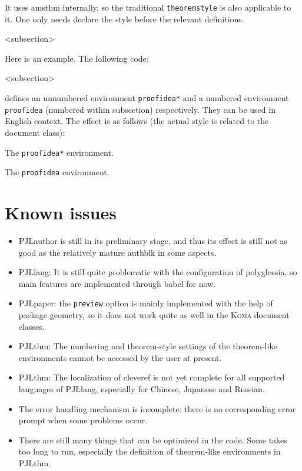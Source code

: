 \documentclass[allowbf]{lebhart}
\newenvironment{remind}[1][Remind]{%
    \begin{tcolorbox}[breakable,
        enhanced,
        width = \textwidth,
        colback = white, colbacktitle = paper,
        colframe = gray!50, boxrule=0.2mm,
        coltitle = black,
        fonttitle = \sffamily,
        attach boxed title to top left = {yshift=-\tcboxedtitleheight/2,  xshift=\tcboxedtitlewidth/4},
        boxed title style = {boxrule=0pt, colframe=paper},
        before skip = 0.3cm,
        after skip = 0.3cm,
        top = 3mm,
        bottom = 3mm,
        title={\scshape\sffamily #1}]%
}{\end{tcolorbox}}
\providecommand{\PJLauthor}{\textsf{PJLauthor}}
\providecommand{\PJLlang}{\textsf{PJLlang}}
\providecommand{\PJLpaper}{\textsf{PJLpaper}}
\providecommand{\PJLthm}{\textsf{PJLthm}}
\begin{document}
\begin{remind}
    It uses \textsf{amsthm} internally, so the traditional \texttt{theoremstyle} is also applicable to it. One only needs declare the style before the relevant definitions.
\end{remind}

\def\proofideanameEN{Idea}
<subsection>

\bigskip
Here is an example. The following code:
\begin{code}
  \def\proofideanameEN{Idea}
  <subsection>
\end{code}
defines an unnumbered environment \lstinline|proofidea*| and a numbered environment \lstinline|proofidea| (numbered within subsection) respectively. They can be used in English context. The effect is as follows (the actual style is related to the document class):

\begin{proofidea*}
    The \lstinline|proofidea*| environment.
\end{proofidea*}

\begin{proofidea}
    The \lstinline|proofidea| environment.
\end{proofidea}


\medskip
\section{Known issues}

\begin{itemize}[itemsep=.6em]
    \item \PJLauthor{} is still in its preliminary stage, and thus its effect is still not as good as the relatively mature \textsf{authblk} in some aspects.
    \item \PJLlang{}: It is still quite problematic with the configuration of \textsf{polyglossia}, so main features are implemented through \textsf{babel} for now.
    \item \PJLpaper{}: the \texttt{preview} option is mainly implemented with the help of package \textsf{geometry}, so it does not work quite as well in the \textsc{\textsf{Koma}} document classes.
    \item \PJLthm{}: The numbering and theorem-style settings of the theorem-like environments cannot be accessed by the user at present.
    \item \PJLthm{}: The localization of \textsf{cleveref} is not yet complete for all supported languages of \PJLlang{}, especially for Chinese, Japanese and Russian.
    \item The error handling mechanism is incomplete: there is no corresponding error prompt when some problems occur.
    \item There are still many things that can be optimized in the code. Some takes too long to run, especially the definition of theorem-like environments in \PJLthm{}.
\end{itemize}
\end{document}
